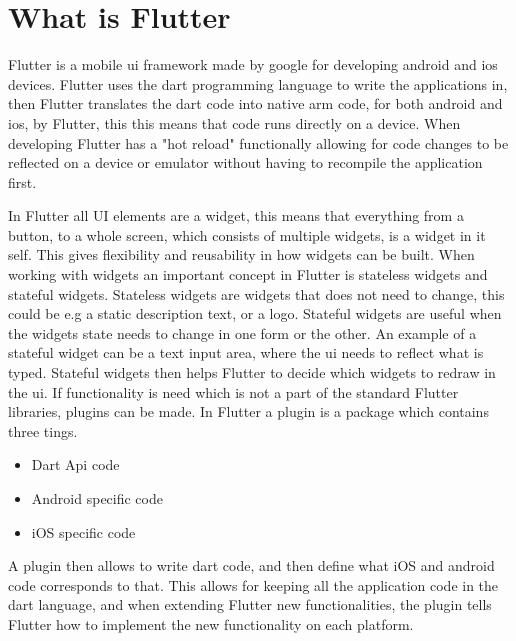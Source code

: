 \section{What is Flutter}


Flutter is a mobile \gls{ui} framework made by google for developing android and ios devices\cite{flutterFAQ}. Flutter uses the dart programming language to write the applications in, then Flutter translates the dart code into native arm code, for both android and ios, by Flutter, this this means that code runs directly on a device.
When developing Flutter has a "hot reload" functionally allowing for code changes to be reflected on a device or emulator without having to recompile the application first.

In Flutter all UI elements are a widget, this means that everything from a  button, to a  whole screen, which consists of multiple widgets, is a widget in it self. This gives flexibility and reusability in how widgets can be built. When working with widgets an important concept in Flutter is stateless widgets and stateful widgets. Stateless widgets are widgets that does not need to change, this could be  e.g a static description text, or a logo. Stateful widgets are useful when the widgets state needs to change in one form or the other.  An example of a stateful widget can be a text input area, where the \gls{ui} needs to reflect what is typed. Stateful widgets then helps Flutter to decide which widgets to redraw in the \gls{ui}.
If functionality is need which is not a part of the standard Flutter libraries, plugins can be made. In Flutter a plugin is a package which contains three tings.

\begin{itemize}
    \item  Dart Api code
    \item  Android specific code
    \item  iOS specific code
\end{itemize}

A plugin then allows to write dart code, and then define what iOS and android code corresponds to that. This allows for keeping all the application code in the dart language, and when extending Flutter new functionalities, the plugin tells Flutter how to implement the new functionality on each platform.